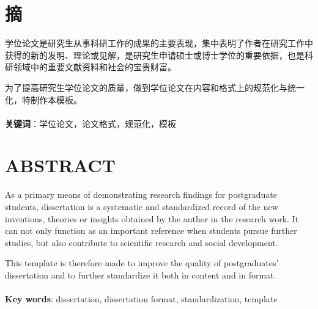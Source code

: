 \section*{摘}

\hspace{8mm}学位论文是研究生从事科研工作的成果的主要表现，集中表明了作者在研究工作中获得的新的发明、理论或见解，是研究生申请硕士或博士学位的重要依据，也是科研领域中的重要文献资料和社会的宝贵财富。\par 
为了提高研究生学位论文的质量，做到学位论文在内容和格式上的规范化与统一化，特制作本模板。\\
~\\
\textbf{关键词}：学位论文，论文格式，规范化，模板\\

\newpage
{}
\section*{ABSTRACT}

\hspace{8mm}As a primary means of demonstrating research findings for postgraduate students, dissertation is a systematic and standardized record of the new inventions, theories or insights obtained by the author in the research work. It can not only function as an important reference when students pursue further studies, but also contribute to scientific research and social development.\par 
This template is therefore made to improve the quality of postgraduates’ dissertation and to further standardize it both in content and in format.\\
~\\ 
\textbf{Key words}: dissertation, dissertation format, standardization, template
